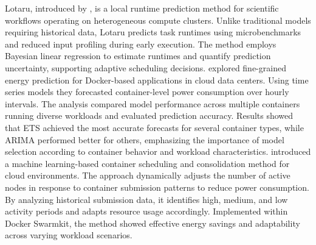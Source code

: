 Lotaru, introduced by \cite{BADER2024171}, is a local runtime prediction method for scientific workflows operating on heterogeneous compute clusters. Unlike traditional models requiring historical data, Lotaru predicts task runtimes using microbenchmarks and reduced input profiling during early execution. The method employs Bayesian linear regression to estimate runtimes and quantify prediction uncertainty, supporting adaptive scheduling decisions.
\cite{10496576} explored fine-grained energy prediction for Docker-based applications in cloud data centers. Using time series models they forecasted container-level power consumption over hourly intervals. The analysis compared model performance across multiple containers running diverse workloads and evaluated prediction accuracy. Results showed that ETS achieved the most accurate forecasts for several container types, while ARIMA performed better for others, emphasizing the importance of model selection according to container behavior and workload characteristics.
\cite{10.1007/978-3-030-30143-9_15} introduced a machine learning-based container scheduling and consolidation method for cloud environments. The approach dynamically adjusts the number of active nodes in response to container submission patterns to reduce power consumption. By analyzing historical submission data, it identifies high, medium, and low activity periods and adapts resource usage accordingly. Implemented within Docker Swarmkit, the method showed effective energy savings and adaptability across varying workload scenarios.






